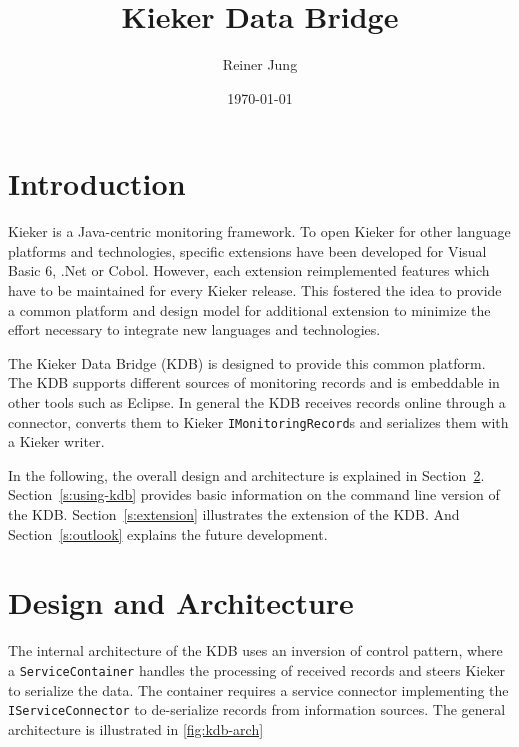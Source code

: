 \documentclass[11pt,a4paper]{article}
\title{Kieker Data Bridge}
\author{Reiner Jung}
\date{\today}
\begin{document}
\maketitle

\tableofcontents

\section{Introduction}  

Kieker is a Java-centric monitoring framework. To open Kieker for other language platforms and technologies, specific extensions have been developed for Visual Basic 6, .Net or Cobol. However, each extension reimplemented features which have to be maintained for every Kieker release. This fostered the idea to provide a common platform and design model for additional extension to minimize the effort necessary to integrate new languages and technologies.

The Kieker Data Bridge (KDB) is designed to provide this common platform. The KDB supports different sources of monitoring records and is embeddable in other tools such as Eclipse. In general the KDB receives records online through a connector, converts them to Kieker \texttt{IMonitoringRecord}s and serializes them with a Kieker writer.

In the following, the overall design and architecture is explained in Section~\ref{s:design}. Section~\ref{s:using-kdb} provides basic information on the command line version of the KDB. Section~\ref{s:extension} illustrates the extension of the KDB. And Section~\ref{s:outlook} explains the future development.

\section{Design and Architecture}\label{s:design}

The internal architecture of the KDB uses an inversion of control pattern, where a \texttt{ServiceContainer} handles the processing of received records and steers Kieker to serialize the data. The container requires a service connector implementing the \texttt{IServiceConnector} to de-serialize records from information sources. The general architecture is illustrated in \autoref{fig:kdb-arch}
\end{document}
